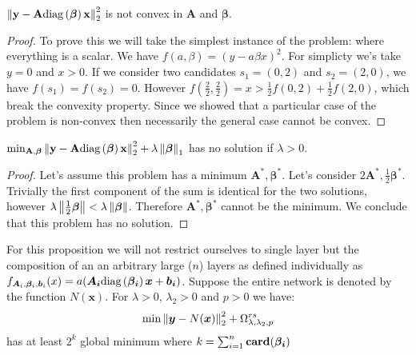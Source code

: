\begin{proposition} \label{unconstrained_non_convex}
$     \left\lVert\bf{y} - \bf{A}\text{diag}\left(\bm{\beta}\right)\bf{x}\right\rVert_2^2
$ is not convex in $\bm{A}$ and $\bm{\beta}$.
\begin{proof}
  To prove this we will take the simplest instance of the problem: where everything is a scalar. We have $f(a, \beta) = \left(y - a\beta x\right)^2$. For simplicty we's take $y = 0$ and $x > 0$. If we consider two candidates $s_1 = (0, 2)$ and $s_2 = (2, 0)$, we have $f(s_1) = f(s_2) = 0$. However $f(\frac{2}{2}, \frac{2}{2}) = x > \frac{1}{2} f(0, 2) + \frac{1}{2}f(2, 0)$, which break the convexity property. Since we showed that a particular case of the problem is non-convex then necessarily the general case cannot be convex.
\end{proof}
\end{proposition}

\begin{proposition}
\label{unconstrained_shrinknet_no_min}
$     \min_{\bf{A}, \bm{\beta}} \left\lVert\bf{y} - \bf{A}\text{diag}\left(\bm{\beta}\right)\bf{x}\right\rVert_2^2 + \lambda \left\lVert\bm{\beta}\right\rVert_1
$
has no solution if $\lambda > 0$.
\end{proposition}
\begin{proof}
  Let's assume this problem has a minimum $\bm{A}^*, \bm{\beta}^*$. Let's consider $2\bm{A}^*, \frac{1}{2}\bm{\beta}^*$. Trivially the first component of the sum is identical for the two solutions, however $\lambda\left\lVert\frac{1}{2}\bm{\beta}\right\rVert < \lambda\left\lVert\bm{\beta}\right\rVert$. Therefore $\bm{A}^*, \bm{\beta}^*$ cannot be the minimum. We conclude that this problem has no solution.
\end{proof}
\begin{proposition}
  \label{shrinknet_regularized_minimum}
For this proposition we will not restrict ourselves to single layer but the composition of an an arbitrary large ($n$) layers as defined individually as $f_{\bm{A}_i, \bm{\beta}_i, \bm{b}_i}(x) = a(\bm{A_i}\text{diag}\left(\bm{\beta_i}\right)\bm{x} + \bm{b_i})$. 
Suppose the entire network is denoted by the function $N(\bm{x})$.
For $\lambda > 0$, $\lambda_2 > 0$ and $p > 0$ we have:
  \begin{equation*}
    \min \left\lVert\bm{y} - N(\bm{x})\right\rVert_2^2 + \Omega_{\lambda, \lambda_2, p}^{rs}
  \end{equation*}
  has at least $2^k$ global minimum where $k = \sum_{i=1}^n {\bf card}(\bm{\beta_i})$
\end{proposition}

